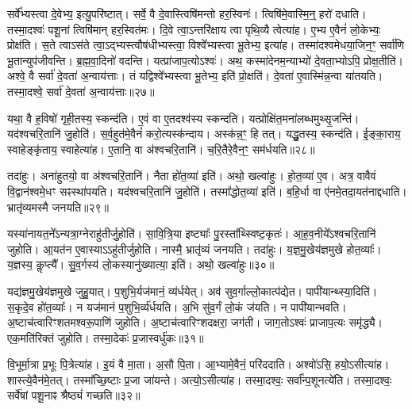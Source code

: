 सर्वे᳚भ्यस्त्वा दे॒वेभ्य॒ इत्यु॒परि॑ष्टात्।
सर्वे॒ वै दे॒वास्त्विषि॑मन्तो हर॒स्विनः॑।
त्विषि॑मे॒वास्मि॒न्॒ हरो॑ दधाति।
तस्मा॒दश्वः॑ पशू॒नां त्विषि॑मान्‌ हर॒स्वित॑मः।
दि॒वे त्वा॒\-ऽन्तरि॑क्षाय त्वा पृथि॒व्यै त्वेत्या॑ह।
ए॒भ्य ए॒वैनं॑ लो॒केभ्यः॒ प्रोक्ष॑ति।
स॒ते त्वा\-ऽस॑ते त्वा॒\-ऽद्भ्यस्त्वौष॑धीभ्यस्त्वा॒ विश्वे᳚भ्यस्त्वा भू॒तेभ्य॒ इत्या॑ह।
तस्मा॑दश्वमेधया॒जिन॒ꣳ॒ सर्वा॑णि भू॒तान्युप॑जीवन्ति।
ब्र॒ह्म॒वा॒दिनो॑ वदन्ति।
यत्प्रा॑जाप॒त्यो\-ऽश्वः॑।
अथ॒ कस्मा॑देनम॒न्याभ्यो॑ दे॒वता॒भ्योऽपि॒ प्रोक्ष॒तीति॑।
अश्वे॒ वै सर्वा॑ दे॒वता॑ अ॒न्वाय॑त्ताः।
तं यद्विश्वे᳚भ्यस्त्वा भू॒तेभ्य॒ इति॑ प्रो॒क्षति॑।
दे॒वता॑ ए॒वास्मि॑न्न॒न्वा या॑तयति।
तस्मा॒दश्वे॒ सर्वा॑ दे॒वता॑ अ॒न्वाय॑त्ताः॥२७॥\ip\anuvakamend[सा॒र॒सा॒रित॒मो\-ऽप॑चिततमः प्राजाप॒त्यो\-ऽश्वः॒ पञ्च॑ च]

यथा॒ वै ह॒विषो॑ गृही॒तस्य॒ स्कन्द॑ति।
ए॒वं वा ए॒तदश्व॑स्य स्कन्दति।
यत्प्रोक्षि॑त॒मना॑लब्धमुथ्सृ॒जन्ति॑।
यद॑श्वचरि॒तानि॑ जु॒होति॑।
स॒र्व॒हुत॑मे॒वैनं॑ करो॒त्यस्क॑न्दाय।
अस्क॑न्न॒ꣳ॒ हि तत्।
यद्धु॒तस्य॒ स्कन्द॑ति।
ई॒ङ्का॒राय॒ स्वाहेङ्कृ॑ताय॒ स्वाहेत्या॑ह।
ए॒तानि॒ वा अ॑श्वचरि॒तानि॑।
च॒रि॒तैरे॒वैन॒ꣳ॒ सम॑र्धयति॥२८॥\ip

तदा॑हुः।
अना॑हुतयो॒ वा अ॑श्वचरि॒तानि॑।
नैता हो॑त॒व्या॑ इति॑।
अथो॒ खल्वा॑हुः।
हो॒त॒व्या॑ ए॒व।
अत्र॒ वावैवं वि॒द्वान॑श्वमे॒धꣳ सꣴस्था॑पयति।
यद॑श्वचरि॒तानि॑ जु॒होति॑।
तस्मा᳚द्धोत॒व्या॑ इति॑।
ब॒हि॒र्धा वा ए॑नमे॒तदा॒यत॑नाद्दधाति।
भ्रातृ॑व्यमस्मै जनयति॥२९॥\ip

यस्या॑नायत॒ने᳚\-ऽन्यत्रा॒ग्नेराहु॑तीर्जु॒होति॑।
सा॒वि॒त्रि॒या इष्ट्याः᳚ पु॒रस्ता᳚थ्स्विष्ट॒कृतः॑।
आ॒ह॒व॒नीये᳚\-ऽश्वचरि॒तानि॑ जुहोति।
आ॒यत॑न ए॒वास्याऽऽहु॑तीर्जुहोति।
नास्मै॒ भ्रातृ॑व्यं जनयति।
तदा॑हुः।
य॒ज्ञ॒\-मु॒खेय॑ज्ञमुखे होत॒व्याः᳚।
य॒ज्ञस्य॒ कॢप्त्यै᳚।
सु॒व॒र्गस्य॑ लो॒कस्यानु॑ख्यात्या॒ इति॑।
अथो॒ खल्वा॑हुः॥३०॥\ip

यद्य॑ज्ञमु॒खेय॑ज्ञमुखे जुहु॒यात्।
प॒शुभि॒र्यज॑मानं॒ व्य॑र्धयेत्।
अव॑ सुव॒र्गाल्लो॒कात्प॑द्येत।
पापी॑यान्थ्स्या॒दिति॑।
स॒कृदे॒व हो॑त॒व्याः᳚।
न यज॑मानं प॒शुभि॒र्व्य॑र्धयति।
अ॒भि सु॑व॒र्गं लो॒कं ज॑यति।
न पापी॑यान्भवति।
अ॒ष्टाच॑त्वारिꣳशतमश्वरू॒पाणि॑ जुहोति।
अ॒ष्टाच॑त्वारिꣳशदक्षरा॒ जग॑ती।
जाग॒तो\-ऽश्वः॑ प्राजाप॒त्यः समृ॑द्ध्यै।
एक॒मति॑रिक्तं जुहोति।
तस्मा॒देकः॑ प्र॒जास्वर्धु॑कः॥३१॥\ip\anuvakamend[अ॒र्ध॒य॒ति॒ ज॒न॒य॒ति॒ खल्वा॑हु॒र्जग॑ती॒ त्रीणि॑ च]

वि॒भूर्मा॒त्रा प्र॒भूः पि॒त्रेत्या॑ह।
इ॒यं वै मा॒ता।
अ॒सौ पि॒ता।
आ॒भ्यामे॒वैनं॒ परि॑ददाति।
अश्वो॑ऽसि॒ हयो॒\-ऽसीत्या॑ह।
शास्त्ये॒वैन॑मे॒तत्।
तस्मा᳚च्छि॒ष्टाः प्र॒जा जा॑यन्ते।
अत्यो॒\-ऽसीत्या॑ह।
तस्मा॒दश्वः॒ सर्वा᳚न्प॒शूनत्ये॑ति।
तस्मा॒दश्वः॒ सर्वे॑षां पशू॒नाꣴ श्रैष्ठ्यं॑ गच्छति॥३२॥\ip

